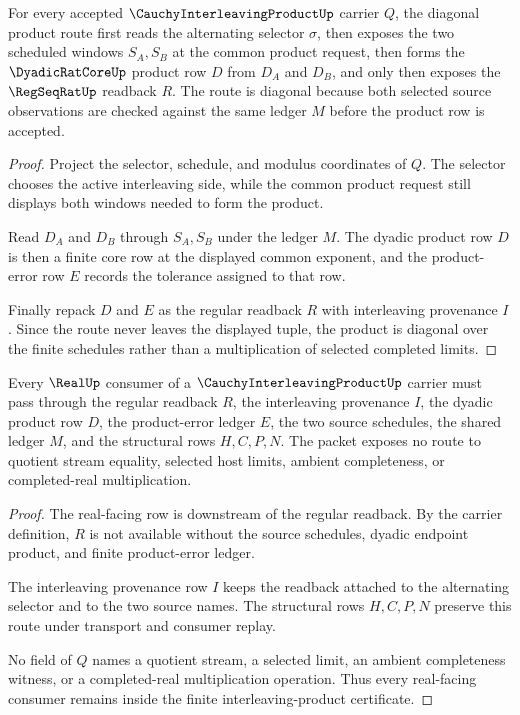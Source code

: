 \begin{theorem}
\label{thm:cauchy-interleaving-product-diagonal-product-route}
For every accepted $\CauchyInterleavingProductUp$ carrier $Q$, the diagonal product route first reads the alternating selector $\sigma$, then exposes the two scheduled windows $S_A,S_B$ at the common product request, then forms the $\DyadicRatCoreUp$ product row $D$ from $D_A$ and $D_B$, and only then exposes the $\RegSeqRatUp$ readback $R$. The route is diagonal because both selected source observations are checked against the same ledger $M$ before the product row is accepted.
\end{theorem}
\begin{proof}
Project the selector, schedule, and modulus coordinates of $Q$. The selector chooses the active interleaving side, while the common product request still displays both windows needed to form the product.

Read $D_A$ and $D_B$ through $S_A,S_B$ under the ledger $M$. The dyadic product row $D$ is then a finite core row at the displayed common exponent, and the product-error row $E$ records the tolerance assigned to that row.

Finally repack $D$ and $E$ as the regular readback $R$ with interleaving provenance $I$. Since the route never leaves the displayed tuple, the product is diagonal over the finite schedules rather than a multiplication of selected completed limits.
\end{proof}

\begin{theorem}
\label{thm:cauchy-interleaving-product-nonescape}
Every $\RealUp$ consumer of a $\CauchyInterleavingProductUp$ carrier must pass through the regular readback $R$, the interleaving provenance $I$, the dyadic product row $D$, the product-error ledger $E$, the two source schedules, the shared ledger $M$, and the structural rows $H,C,P,N$. The packet exposes no route to quotient stream equality, selected host limits, ambient completeness, or completed-real multiplication.
\end{theorem}
\begin{proof}
The real-facing row is downstream of the regular readback. By the carrier definition, $R$ is not available without the source schedules, dyadic endpoint product, and finite product-error ledger.

The interleaving provenance row $I$ keeps the readback attached to the alternating selector and to the two source names. The structural rows $H,C,P,N$ preserve this route under transport and consumer replay.

No field of $Q$ names a quotient stream, a selected limit, an ambient completeness witness, or a completed-real multiplication operation. Thus every real-facing consumer remains inside the finite interleaving-product certificate.
\end{proof}

